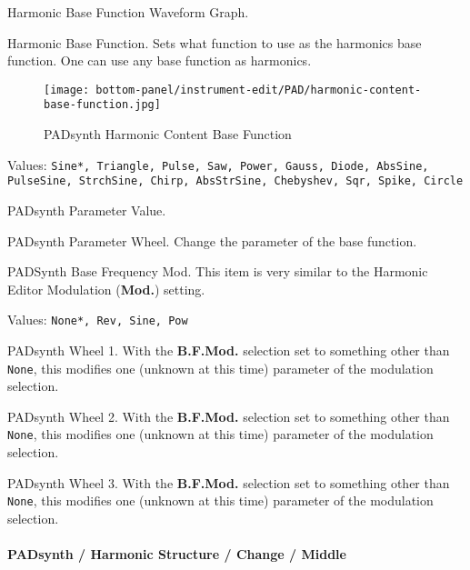    Harmonic Base Function Waveform Graph.

   Harmonic Base Function.
   Sets what function to use as the harmonics base function.
   One can use any base function as harmonics. 

\begin{figure}[H]
   \centering 
   \texttt{[image: bottom-panel/instrument-edit/PAD/harmonic-content-base-function.jpg]}
   \caption{PADsynth Harmonic Content Base Function}
   \label{fig:padsynth_harmonic_content_base_function}
\end{figure}

   Values: \texttt{Sine*, Triangle, Pulse, Saw, Power, Gauss, Diode, AbsSine,
           PulseSine, StrchSine, Chirp, AbsStrSine, Chebyshev,
           Sqr, Spike, Circle}

   PADsynth Parameter Value.

   PADsynth Parameter Wheel.
   Change the parameter of the base function. 

   PADSynth Base Frequency Mod.
   This item is very similar to the Harmonic Editor Modulation
   (\textbf{Mod.}) setting.

   Values: \texttt{None*, Rev, Sine, Pow}

   PADsynth Wheel 1.
   With the \textbf{B.F.Mod.} selection set to something other than
   \texttt{None}, this modifies one (unknown at this time) parameter of the
   modulation selection.

   PADsynth Wheel 2.
   With the \textbf{B.F.Mod.} selection set to something other than
   \texttt{None}, this modifies one (unknown at this time) parameter of the
   modulation selection.

   PADsynth Wheel 3.
   With the \textbf{B.F.Mod.} selection set to something other than
   \texttt{None}, this modifies one (unknown at this time) parameter of the
   modulation selection.

\paragraph{PADsynth / Harmonic Structure / Change / Middle}
\label{paragraph:padsynth_harmonic_structure_change_middle}

